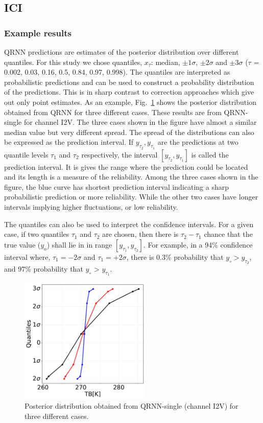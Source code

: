 \documentclass[amt, manuscript]{copernicus}
\begin{document}
\subsection{ICI}
\subsubsection{Example results}
%
QRNN predictions are estimates of the posterior distribution over different quantiles. For this study we chose quantiles, $x_{\tau}$: median, $\pm 1\sigma$, $\pm 2 \sigma$ and  $\pm 3 \sigma$ ($\tau$ = 0.002, 0.03, 0.16, 0.5, 0.84, 0.97, 0.998). The quantiles are interpreted as probabilistic predictions and can be used to construct a probability distribution of the predictions. This is in sharp contrast to correction approaches which give out only point estimates. As an example, Fig.~\ref{fig:posterior_distribution_I2V} shows the posterior distribution obtained from QRNN for three different cases. These results are from QRNN-single for channel I2V. The three cases shown in the figure have almost a similar median value but very different spread. The spread of the distributions can also be expressed as the prediction interval. If $y_{\tau_2}, y_{\tau_1}$ are the predictions at two quantile levels $\tau_1$ and $\tau_2$ respectively, the interval $[y_{\tau_2}, y_{\tau_1}]$ is called the prediction interval. It is gives the range where the prediction could be located and its length is a measure of the reliability. Among the three cases shown in the figure, the blue curve has shortest prediction interval indicating a sharp probabilistic prediction or more reliability. While the other two cases have longer intervals implying higher fluctuations, or low reliability.

The quantiles can also be used to  interpret the confidence intervals. For a given case, if two quantiles $\tau_1$ and $\tau_2$ are chosen, then there is $\tau_2 - \tau_1$ chance that the true value ($y_o$) shall lie in in range $[y_{\tau_1}, y_{\tau_2}]$. For example, in a 94\% confidence interval where, $\tau_1 = -2\sigma$ and $\tau_1 = +2\sigma$, there is 0.3\% probability that $y_\circ > y_{\tau_2}$, and 97\% probability that $y_\circ$ > $y_{\tau_1}$. 

\begin{figure}[t]
	\centering
	\includegraphics[height=60mm]{Figures/posterior_distribution_I2V.pdf} 
	\caption{Posterior distribution obtained from QRNN-single (channel I2V) for three different cases. }
	\label{fig:posterior_distribution_I2V}	
\end{figure}
\end{document}
